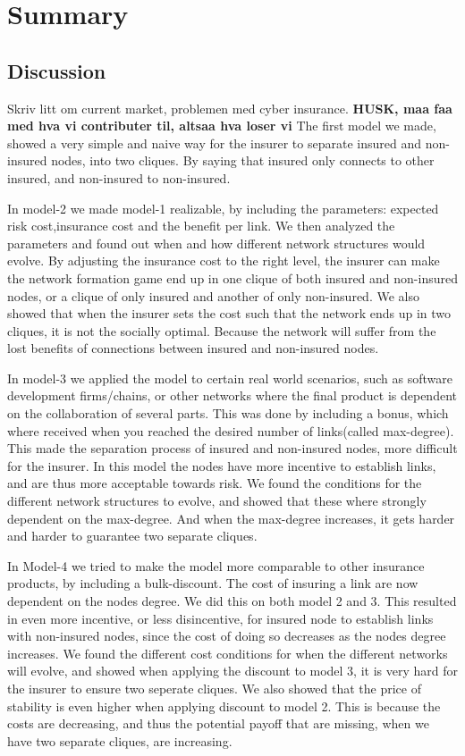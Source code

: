 \chapter{Summary}

\section{Discussion}
Skriv litt om current market, problemen med cyber insurance.
\textbf{HUSK, maa faa med hva vi contributer til, altsaa hva loser vi}
The first model we made, showed a very simple and naive way for the insurer to separate insured and non-insured nodes, into two cliques. By saying that insured only connects to other insured, and non-insured to non-insured. 

 In model-2 we made model-1 realizable, by including the parameters: expected risk cost,insurance cost and the benefit per link. We then analyzed the parameters and found out when and how different network structures would evolve. By adjusting the insurance cost to the right level, the insurer can make the network formation game end up in one clique of both insured and non-insured nodes, or a clique of only insured and another of only non-insured. 
We also showed that when the insurer sets the cost such that the network ends up in two cliques, it is not the socially optimal. Because the network will suffer from the lost benefits of connections between insured and non-insured nodes. 

In model-3 we applied the model to certain real world scenarios, such as software development firms/chains, or other networks where the final product is dependent on the collaboration of several parts.
This was done by including a bonus, which where received when you reached the desired number of links(called max-degree). This made the separation process of insured and non-insured nodes, more difficult for the insurer. In this model the nodes have more incentive to establish links, and are thus more acceptable towards risk. We found the conditions for the different network structures to evolve, and showed that these where strongly dependent on the max-degree. And when the max-degree increases, it gets harder and harder to guarantee two separate cliques.

In Model-4 we tried to make the model more comparable to other insurance products, by including a bulk-discount. The cost of insuring a link are now dependent on the nodes degree. We did this on both model 2 and 3. This resulted in even more incentive, or less disincentive, for insured node to establish links with non-insured nodes, since the cost of doing so decreases as the nodes degree increases. 
We found the different cost conditions for when the different networks will evolve, and showed when applying the discount to model 3, it is very hard for the insurer to ensure two seperate cliques. 
We also showed that the price of stability is even higher when applying discount to model 2. This is because the costs are decreasing, and thus the potential payoff that are missing, when we have two separate cliques, are increasing. 

